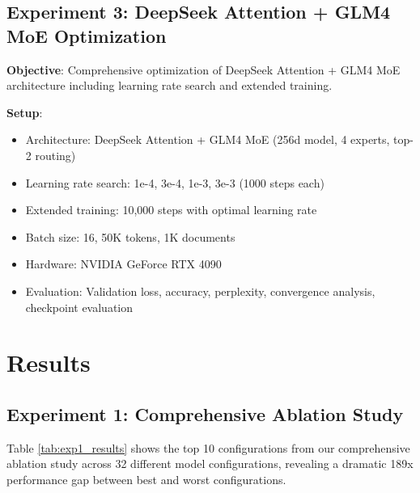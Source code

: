 \documentclass[11pt,a4paper]{article}
\begin{document}
\subsection{Experiment 3: DeepSeek Attention + GLM4 MoE Optimization}

\textbf{Objective}: Comprehensive optimization of DeepSeek Attention + GLM4 MoE architecture including learning rate search and extended training.

\textbf{Setup}:
\begin{itemize}
    \item Architecture: DeepSeek Attention + GLM4 MoE (256d model, 4 experts, top-2 routing)
    \item Learning rate search: 1e-4, 3e-4, 1e-3, 3e-3 (1000 steps each)
    \item Extended training: 10,000 steps with optimal learning rate
    \item Batch size: 16, 50K tokens, 1K documents
    \item Hardware: NVIDIA GeForce RTX 4090
    \item Evaluation: Validation loss, accuracy, perplexity, convergence analysis, checkpoint evaluation
\end{itemize}


\section{Results}

\subsection{Experiment 1: Comprehensive Ablation Study}

Table \ref{tab:exp1_results} shows the top 10 configurations from our comprehensive ablation study across 32 different model configurations, revealing a dramatic 189x performance gap between best and worst configurations.
\end{document}
